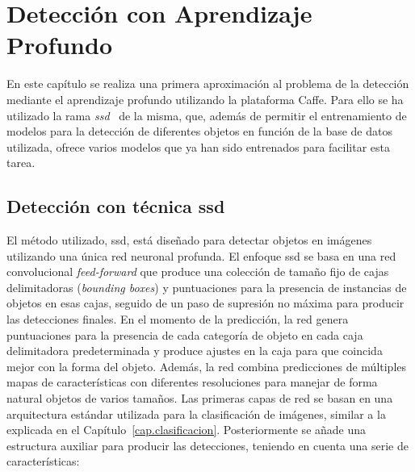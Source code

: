 \chapter{Detección con Aprendizaje Profundo}\label{cap.deteccion}
En este capítulo se realiza una primera aproximación al problema de la detección mediante el aprendizaje profundo utilizando la plataforma Caffe. Para ello se ha utilizado la rama \textit{\acrfull{ssd}}~\cite{liu2016ssd} de la misma, que, además de permitir el entrenamiento de modelos para la detección de diferentes objetos en función de la base de datos utilizada, ofrece varios modelos que ya han sido entrenados para facilitar esta tarea.\\

\section{Detección con técnica \acrshort{ssd}}
El método utilizado, \acrshort{ssd}, está diseñado para detectar objetos en imágenes utilizando una única red neuronal profunda. El enfoque \acrshort{ssd} se basa en una red convolucional \textit{feed-forward} que produce una colección de tamaño fijo de cajas delimitadoras (\textit{bounding boxes}) y puntuaciones para la presencia de instancias de objetos en esas cajas, seguido de un paso de supresión no máxima para producir las detecciones finales. En el momento de la predicción, la red genera puntuaciones para la presencia de cada categoría de objeto en cada caja delimitadora predeterminada y produce ajustes en la caja para que coincida mejor con la forma del objeto. Además, la red combina predicciones de múltiples mapas de características con diferentes resoluciones para manejar de forma natural objetos de varios tamaños. Las primeras capas de red se basan en una arquitectura estándar utilizada para la clasificación de imágenes, similar a la explicada en el Capítulo~\ref{cap.clasificacion}. Posteriormente se añade una estructura auxiliar para producir las detecciones, teniendo en cuenta una serie de características:
